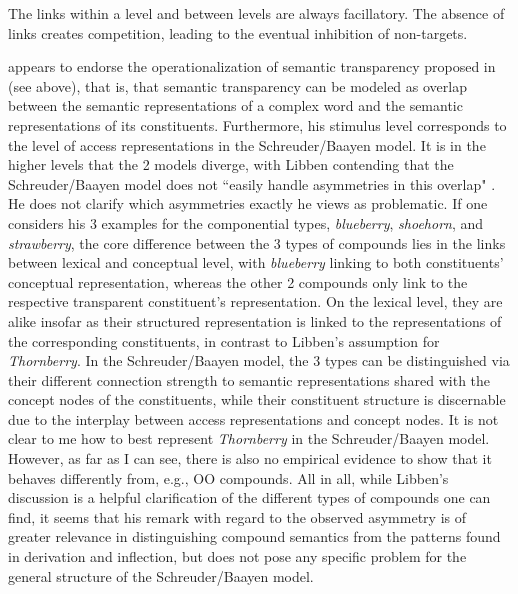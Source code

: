 \noindent
The links within a level and between levels are always facillatory. The absence of links creates competition, leading to the eventual inhibition of non-targets.

\citet[33]{Libben:1998} appears to endorse the operationalization of
semantic transparency proposed in
\citet[140]{SchreuderandBaayen:1995} (see above), that is, that
semantic transparency can be modeled as overlap between the semantic
representations of a complex word and the semantic representations of its
constituents. Furthermore, his stimulus level
corresponds to the level of access representations in the
Schreuder/Baayen model. It is in the higher levels that the 2 models
diverge, with Libben contending that the Schreuder/Baayen model does not ``easily
handle asymmetries in this overlap" \citep[33]{Libben:1998}.  He does
not clarify which asymmetries exactly he views as problematic. If one
considers his 3 examples for the componential types,
\emph{blueberry}, \emph{shoehorn}, and \emph{strawberry}, the core
difference between the 3 types of compounds lies in  the links
between lexical and conceptual level, with \emph{blueberry} linking to
both constituents' conceptual representation, whereas the other 2 compounds only
link to the respective transparent constituent's representation. On
the lexical level, they are alike insofar as their structured
representation is linked to the representations of the corresponding
constituents, in contrast to Libben's assumption for
\emph{Thornberry}. In the Schreuder/Baayen model, the 3 types
can be distinguished via their different connection strength to
semantic representations shared with the concept nodes of the
constituents, while their constituent structure is discernable
due to the interplay between access representations and concept
nodes. It is not clear to me how to best represent \emph{Thornberry}
in the Schreuder/Baayen model. However, as far as I can see, there is
also no empirical evidence to show that it behaves differently from,
e.g., OO compounds. All in all, while Libben's discussion is a helpful
clarification of the different types of compounds one can find, it
seems that his remark with regard to the observed asymmetry is of
greater relevance in distinguishing compound semantics from the
patterns found in derivation and inflection, but does not pose any
specific problem for the general structure of the Schreuder/Baayen model.


